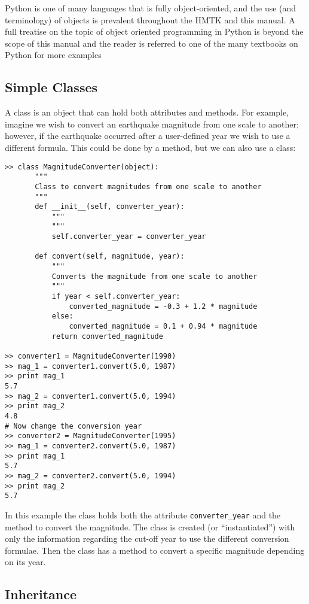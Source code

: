 Python is one of many languages that is fully object-oriented, and the use (and terminology) of objects is prevalent throughout the HMTK and this manual. A full treatise on the topic of object oriented programming in Python is beyond the scope of this manual and the reader is referred to one of the many textbooks on Python for more examples

\subsection{Simple Classes}

A class is an object that can hold both attributes and methods. For example, imagine we wish to convert an earthquake magnitude from one scale to another; however, if the earthquake occurred after a user-defined year we wish to use a different formula. This could be done by a method, but we can also use a class:

\begin{lstlisting}[frame=single]
>> class MagnitudeConverter(object):
       """
       Class to convert magnitudes from one scale to another
       """
       def __init__(self, converter_year):
           """
           """
           self.converter_year = converter_year
       
       def convert(self, magnitude, year):
           """
           Converts the magnitude from one scale to another
           """
           if year < self.converter_year:
               converted_magnitude = -0.3 + 1.2 * magnitude
           else:
               converted_magnitude = 0.1 + 0.94 * magnitude
           return converted_magnitude
                  
>> converter1 = MagnitudeConverter(1990)
>> mag_1 = converter1.convert(5.0, 1987)
>> print mag_1
5.7
>> mag_2 = converter1.convert(5.0, 1994)
>> print mag_2
4.8
# Now change the conversion year
>> converter2 = MagnitudeConverter(1995)
>> mag_1 = converter2.convert(5.0, 1987)
>> print mag_1
5.7
>> mag_2 = converter2.convert(5.0, 1994)
>> print mag_2
5.7  
\end{lstlisting}

In this example the class holds both the attribute \verb=converter_year= and the method to convert the magnitude. The class is created (or ``instantiated'') with only the information regarding the cut-off year to use the different conversion formulae. Then the class has a method to convert a specific magnitude depending on its year.

\subsection{Inheritance}


